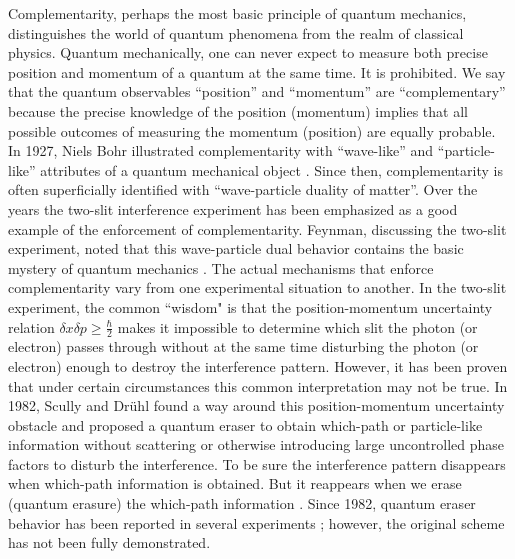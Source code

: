 Complementarity, perhaps the most basic principle of quantum mechanics, distinguishes the
world of quantum phenomena from the realm of classical physics. Quantum mechanically, one
can never expect to measure both precise position and momentum of a quantum at the same
time. It is prohibited. We say that the quantum observables ``position'' and ``momentum''
are ``complementary'' because the precise knowledge of the position (momentum) implies
that all possible outcomes of measuring the momentum (position) are equally probable. In
1927, Niels Bohr illustrated complementarity with ``wave-like'' and ``particle-like''
attributes of a quantum mechanical object \cite{Bohr}. Since then, complementarity is
often superficially identified with ``wave-particle duality of matter''. Over the years
the two-slit interference experiment has been emphasized as a good example of the
enforcement of complementarity. Feynman, discussing the two-slit experiment, noted that
this wave-particle dual behavior contains the basic mystery of quantum mechanics
\cite{Feynman}. The actual mechanisms that enforce complementarity vary from one
experimental situation to another. In the two-slit experiment, the common ``wisdom" is
that the position-momentum uncertainty relation $\delta x\delta p\geq \frac{\hbar }{2}$
makes it impossible to determine which slit the photon (or electron) passes through
without at the same time disturbing the photon (or electron) enough to destroy the
interference pattern. However, it has been proven \cite {Scully} that under certain
circumstances this common interpretation may not be true. In 1982, Scully and Dr\"{u}hl
found a way around this position-momentum uncertainty obstacle and proposed a quantum
eraser to obtain which-path or particle-like information without scattering or
\newpage \vspace*{30mm}
\noindent otherwise introducing large uncontrolled phase factors to disturb the
interference. To be sure the interference pattern disappears when which-path information
is obtained. But it reappears when we erase (quantum erasure) the which-path information
\cite{Scully,Wheeler}. Since 1982, quantum eraser behavior has been reported in several
experiments \cite{History}; however, the original scheme has not been fully demonstrated.

